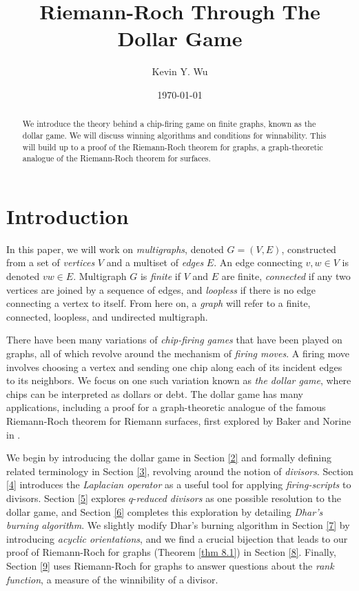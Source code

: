 \documentclass[openany, amssymb, psamsfonts]{amsart}
\title{Riemann-Roch Through The Dollar Game}
\author{Kevin Y. Wu}
\date{\today}
\theoremstyle{definition}
\numberwithin{equation}{section}
\begin{document}
\begin{abstract}

We introduce the theory behind a chip-firing game on finite graphs, known as the dollar game. We will discuss winning algorithms and conditions for winnability. This will build up to a proof of the Riemann-Roch theorem for graphs, a graph-theoretic analogue of the Riemann-Roch theorem for surfaces.

\end{abstract}



\maketitle

\tableofcontents





\section{Introduction}
\label{1}

In this paper, we will work on \textit{multigraphs}, denoted $G=(V,E)$, constructed from a set of \textit{vertices} $V$ and a multiset of \textit{edges} $E$. An edge connecting $v,w\in V$ is denoted $vw\in E$. Multigraph $G$ is \textit{finite} if $V$ and $E$ are finite, \textit{connected} if any two vertices are joined by a sequence of edges, and \textit{loopless} if there is no edge connecting a vertex to itself. From here on, a \textit{graph} will refer to a finite, connected, loopless, and undirected multigraph. 

There have been many variations of \textit{chip-firing games} that have been played on graphs, all of which revolve around the mechanism of \textit{firing moves}. A firing move involves choosing a vertex and sending one chip along each of its incident edges to its neighbors. We focus on one such variation known as \textit{the dollar game}, where chips can be interpreted as dollars or debt. The dollar game has many applications, including a proof for a graph-theoretic analogue of the famous Riemann-Roch theorem for Riemann surfaces, first explored by Baker and Norine in \cite{baker}.

We begin by introducing the dollar game in Section \ref{2} and formally defining related terminology in Section \ref{3}, revolving around the notion of \textit{divisors}. Section \ref{4} introduces the \textit{Laplacian operator} as a useful tool for applying \textit{firing-scripts} to divisors. Section \ref{5} explores $q$-\textit{reduced divisors} as one possible resolution to the dollar game, and Section \ref{6} completes this exploration by detailing \textit{Dhar's burning algorithm}. We slightly modify Dhar's burning algorithm in Section \ref{7} by introducing \textit{acyclic orientations}, and we find a crucial bijection that leads to our proof of Riemann-Roch for graphs (Theorem \ref{thm 8.1}) in Section \ref{8}. Finally, Section \ref{9} uses Riemann-Roch for graphs to answer questions about the \textit{rank function}, a measure of the winnibility of a divisor.
\end{document}

